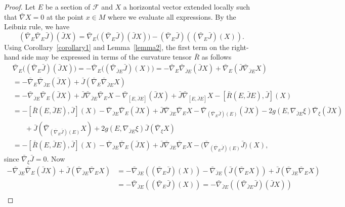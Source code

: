 \documentclass[10pt,a4paper]{amsart}
\newcommand{\f}{\mathcal{F}}
\begin{document}
\begin{proof}
  Let $E$ be a section of $\f$ and $X$ a horizontal vector 
  extended locally such that $\bar{\nabla} X =0$ at the point
  $x\in M$ where we evaluate all expressions.  By the Leibniz
  rule, we have
  $$
  (\bar{\nabla}_E\bar{\nabla}_E \bar{J})(\bar{J}X)=\bar{\nabla}_E
  \big((\bar{\nabla}_E \bar{J})
  (\bar{J}X)\big)-(\bar{\nabla}_{E}\bar{J})((\bar{\nabla}_E \bar{J}) (X)).
  $$
  Using Corollary~\ref{corollary1} and Lemma~\ref{lemma2}, the
  first term on the right-hand side may be expressed in terms of
  the curvature tensor $\bar{R}$ as follows
\begin{align*}
&\bar{\nabla}_E\big((\bar{\nabla}_E \bar{J}) (\bar{J}X)\big)  = -\bar{\nabla}_E\big((\bar{\nabla}_{\bar{J}E}\bar{J}) (X)\big) 
 =-\bar{\nabla}_E\bar{\nabla}_{\bar{J}E}(\bar{J}X)+\bar{\nabla}_E(\bar{J}\bar{\nabla}_{\bar{J}E}
  X) \\
  &= -\bar{\nabla}_E\bar{\nabla}_{\bar{J}E}(\bar{J}X)+ \bar{J}(\bar{\nabla}_{E}\bar{\nabla}_{\bar{J}E}X)\\ 
& =-\bar{\nabla}_{\bar{J}E}\bar{\nabla}_E(\bar{J}X)+\bar{J}\bar{\nabla}_{\bar{J}E}\bar{\nabla}_E X -\bar{\nabla}_{[E,\bar{J}E]}(\bar{J}X)+ \bar{J}\bar{\nabla}_{[E,\bar{J}E]}X-[\bar{R}(E,\bar{J}E),\bar{J}](X)\\
&= -[\bar{R}(E,\bar{J}E),\bar{J}](X)  -\bar{\nabla}_{\bar{J}E}\bar{\nabla}_E(\bar{J}X)+\bar{J}\bar{\nabla}_{\bar{J}E}\bar{\nabla}_E  X - \bar{\nabla}_{(\bar{\nabla}_E \bar{J})(E)}(\bar{J}X)
  - 2g(  E, \nabla_{\bar{J} E}\xi) \bar{\nabla}_{\xi} (\bar{J}X)
  \\ & \phantom{xxx}+\bar{J}(\bar{\nabla}_{(\bar{\nabla}_E \bar{J})(E)}X)
+2g(  E, \nabla_{\bar{J} E}\xi) \bar{J}(\bar{\nabla}_{\xi}X)\\
  & =  -[\bar{R}(E,\bar{J}E),\bar{J}](X)  -\bar{\nabla}_{\bar{J}E}\bar{\nabla}_E(\bar{J}X)+\bar{J}\bar{\nabla}_{\bar{J}E}\bar{\nabla}_E X - \big(\bar{\nabla}_{(\bar{\nabla}_E \bar{J})(E)}\bar{J}\big)(X),
\end{align*}
since $\bar{\nabla}_{\xi} \bar{J} =0$. Now 
\begin{align*}
-\bar{\nabla}_{\bar{J}E}\bar{\nabla}_E(\bar{J}X) +\bar{J} (\bar{\nabla}_{\bar{J}E}\bar{\nabla}_E X)
&= -\bar{\nabla}_{\bar{J}E}((\bar{\nabla}_E \bar{J})(X)) -\bar{\nabla}_{\bar{J}E}(\bar{J}(\bar{\nabla}_E X))+\bar{J} (\bar{\nabla}_{\bar{J}E}\bar{\nabla}_E X)\\
&= -\bar{\nabla}_{\bar{J}E}((\bar{\nabla}_E \bar{J})(X))
= - \bar{\nabla}_{\bar{J}E}((\bar{\nabla}_{\bar{J}E}\bar{J})(\bar{J}X))\\

\end{align*}
\end{proof}
\end{document}
